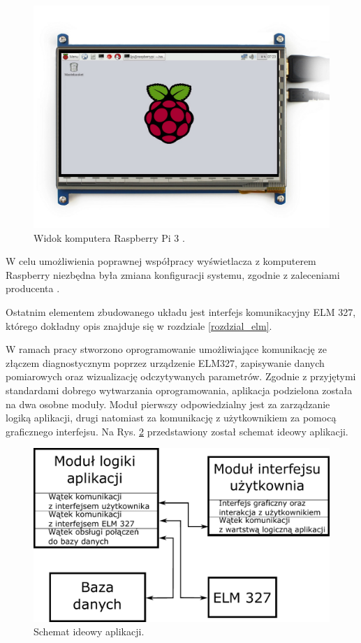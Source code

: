 \documentclass[12pt, twoside]{article} %
\numberwithin{equation}{subsection}
\numberwithin{figure}{section}
\numberwithin{table}{section}
\begin{document}
		\begin{figure}[!h]
			\centering
			\includegraphics[scale=0.25]{Images/rys_wyswietlacz.png}
			\caption{Widok komputera Raspberry Pi 3 \cite{wyswietlaczwidok}.}
			\label{rys_wyswietlacz}
		\end{figure}
		W celu umożliwienia poprawnej współpracy wyświetlacza z komputerem Raspberry niezbędna była zmiana konfiguracji systemu, zgodnie z zaleceniami producenta \cite{wyswietlaczconf}.
		
		Ostatnim elementem zbudowanego układu jest interfejs komunikacyjny ELM 327, którego dokładny opis znajduje się w rozdziale \ref{rozdzial_elm}.

\newpage

W ramach pracy stworzono oprogramowanie umożliwiające komunikację ze złączem diagnostycznym poprzez urządzenie ELM327, zapisywanie danych pomiarowych oraz wizualizację odczytywanych parametrów. Zgodnie z przyjętymi standardami dobrego wytwarzania oprogramowania, aplikacja podzielona została na dwa osobne moduły. Moduł pierwszy odpowiedzialny jest za zarządzanie logiką aplikacji, drugi natomiast za komunikację z użytkownikiem za pomocą graficznego interfejsu. Na Rys. \ref{rys_ogolny_schemat_aplikacji} przedstawiony został schemat ideowy aplikacji.

		\begin{figure}[!h]
			\centering
			\includegraphics[scale=0.75]{Images/rys_ogolny_schemat_aplikacji.pdf}
			\caption{Schemat ideowy aplikacji.}
			\label{rys_ogolny_schemat_aplikacji}
		\end{figure}
\end{document}
